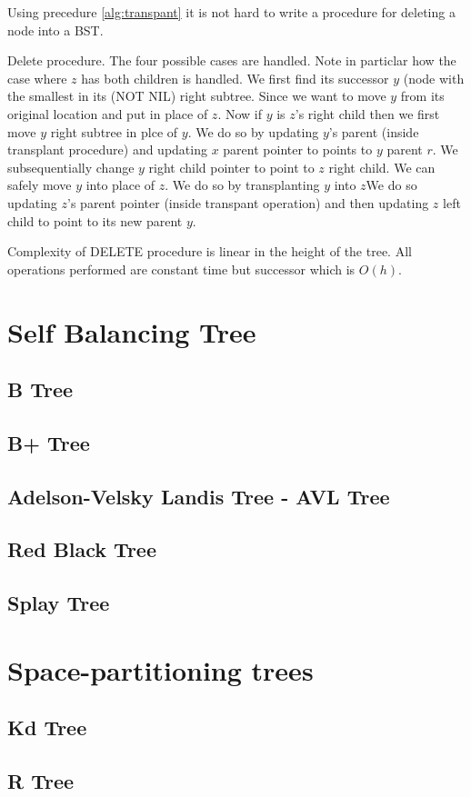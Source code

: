 Using precedure \ref{alg:transpant} it is not hard to write a procedure for deleting a node into a BST.
\begin{algorithm}
\caption{Delete procedure. The four possible cases are handled.  Note in particlar how the case where $z$ has both children is handled. We first find its successor $y$ (node with the  smallest in its (NOT NIL) right subtree. Since we want to move $y$ from its original location and put in place of $z$. Now if $y$ is $z$'s right child then we first move $y$ right subtree in plce of $y$. We do so by updating $y$'s parent (inside transplant procedure) and updating $x$ parent pointer  to points to $y$ parent $r$. We subsequentially change $y$ right child pointer to point to $z$ right child. We can safely move $y$ into place of $z$. We do so by transplanting $y$ into $z$We do so updating $z$'s parent pointer (inside transpant operation) and then updating $z$ left child to point to its new parent $y$.}\label{alg:transpant}
\end{algorithm}

Complexity of DELETE procedure is linear in the height of the tree. All operations performed are constant time but successor which is $O(h)$.

\section{Self Balancing Tree}
\subsection{B Tree}
\subsection{B+ Tree}

\subsection{Adelson-Velsky Landis Tree - AVL Tree}
\subsection{Red Black Tree}
\subsection{Splay Tree}


\section{Space-partitioning trees}
\subsection{Kd Tree}
\subsection{R Tree}